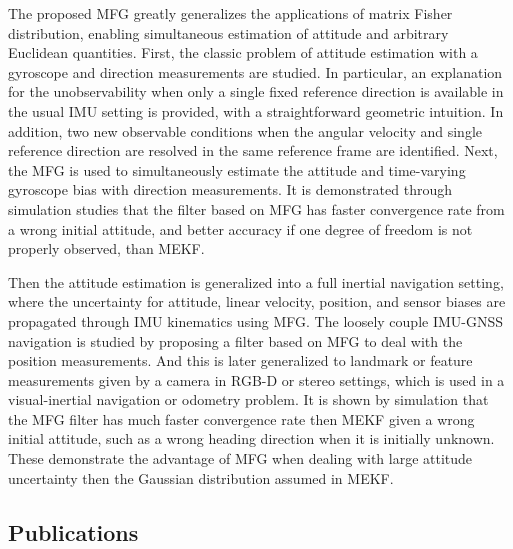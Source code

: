 The proposed MFG greatly generalizes the applications of matrix Fisher distribution, enabling simultaneous estimation of attitude and arbitrary Euclidean quantities.
First, the classic problem of attitude estimation with a gyroscope and direction measurements are studied.
In particular, an explanation for the unobservability when only a single fixed reference direction is available in the usual IMU setting is provided, with a straightforward geometric intuition.
In addition, two new observable conditions when the angular velocity and single reference direction are resolved in the same reference frame are identified.
Next, the MFG is used to simultaneously estimate the attitude and time-varying gyroscope bias with direction measurements.
It is demonstrated through simulation studies that the filter based on MFG has faster convergence rate from a wrong initial attitude, and better accuracy if one degree of freedom is not properly observed, than MEKF.

Then the attitude estimation is generalized into a full inertial navigation setting, where the uncertainty for attitude, linear velocity, position, and sensor biases are propagated through IMU kinematics using MFG.
The loosely couple IMU-GNSS navigation is studied by proposing a filter based on MFG to deal with the position measurements.
And this is later generalized to landmark or feature measurements given by a camera in RGB-D or stereo settings, which is used in a visual-inertial navigation or odometry problem.
It is shown by simulation that the MFG filter has much faster convergence rate then MEKF given a wrong initial attitude, such as a wrong heading direction when it is initially unknown.
These demonstrate the advantage of MFG when dealing with large attitude uncertainty then the Gaussian distribution assumed in MEKF.

\subsection{Publications}

